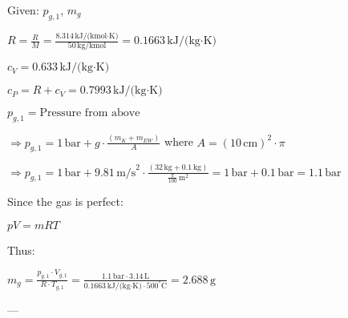 Given: \( p_{g,1} \), \( m_g \)  

\( R = \frac{R}{M} = \frac{8.314 \, \text{kJ/(kmol·K)}}{50 \, \text{kg/kmol}} = 0.1663 \, \text{kJ/(kg·K)} \)  

\( c_V = 0.633 \, \text{kJ/(kg·K)} \)  

\( c_P = R + c_V = 0.7993 \, \text{kJ/(kg·K)} \)  

\( p_{g,1} = \text{Pressure from above} \)  

\( \Rightarrow p_{g,1} = 1 \, \text{bar} + g \cdot \frac{(m_K + m_{EW})}{A} \) where \( A = (10 \, \text{cm})^2 \cdot \pi \)  

\( \Rightarrow p_{g,1} = 1 \, \text{bar} + 9.81 \, \text{m/s}^2 \cdot \frac{(32 \, \text{kg} + 0.1 \, \text{kg})}{\frac{\pi}{100} \, \text{m}^2} = 1 \, \text{bar} + 0.1 \, \text{bar} = 1.1 \, \text{bar} \)  

Since the gas is perfect:  

\( pV = mRT \)  

Thus:  

\( m_g = \frac{p_{g,1} \cdot V_{g,1}}{R \cdot T_{g,1}} = \frac{1.1 \, \text{bar} \cdot 3.14 \, \text{L}}{0.1663 \, \text{kJ/(kg·K)} \cdot 500^\circ \text{C}} = 2.688 \, \text{g} \)  

---